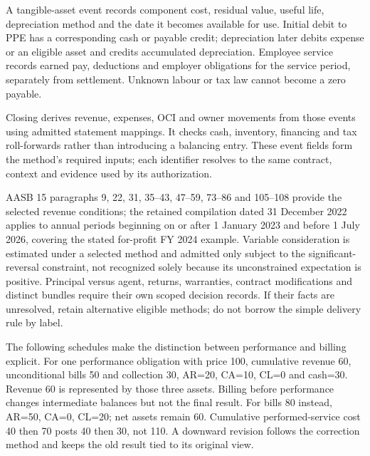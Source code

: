 A tangible-asset event records component cost, residual value, useful life,
depreciation method and the date it becomes available for use. Initial debit to
PPE has a corresponding cash or payable credit; depreciation later debits
expense or an eligible asset and credits accumulated depreciation. Employee
service records earned pay, deductions and employer obligations for the service
period, separately from settlement. Unknown labour or tax law cannot become a
zero payable.

Closing derives revenue, expenses, OCI and owner movements from those events
using admitted statement mappings. It checks cash, inventory, financing and tax
roll-forwards rather than introducing a balancing entry. These event fields
form the method's required inputs; each identifier resolves to the same
contract, context and evidence used by its authorization.


AASB 15 paragraphs 9, 22, 31, 35--43, 47--59, 73--86 and 105--108 provide the selected revenue conditions; the retained compilation dated 31 December 2022 applies to annual periods beginning on or after 1 January 2023 and before 1 July 2026, covering the stated for-profit FY 2024 example. Variable consideration is estimated under a selected method and admitted only subject to the significant-reversal constraint, not recognized solely because its unconstrained expectation is positive. Principal versus agent, returns, warranties, contract modifications and distinct bundles require their own scoped decision records. If their facts are unresolved, retain alternative eligible methods; do not borrow the simple delivery rule by label.

The following schedules make the distinction between performance and billing explicit. For one performance obligation with price 100, cumulative revenue 60, unconditional bills 50 and collection 30, AR=20, CA=10, CL=0 and cash=30. Revenue 60 is represented by those three assets. Billing before performance changes intermediate balances but not the final result. For bills 80 instead, AR=50, CA=0, CL=20; net assets remain 60. Cumulative performed-service cost 40 then 70 posts 40 then 30, not 110. A downward revision follows the correction method and keeps the old result tied to its original view.

